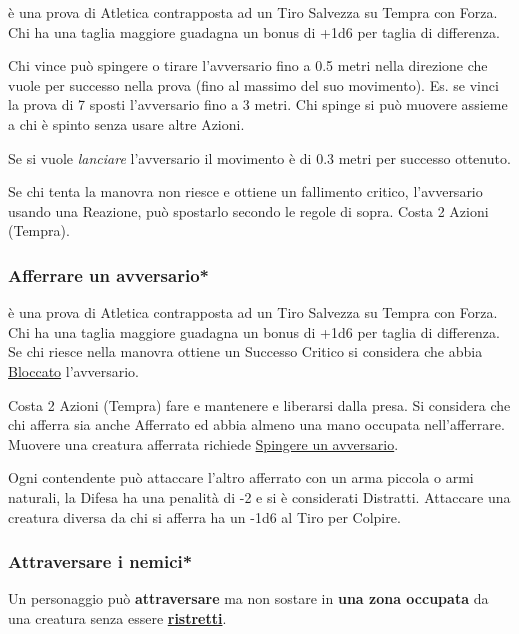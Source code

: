 \begin{multicols}{2}
è una prova di Atletica contrapposta ad un Tiro Salvezza su Tempra con Forza. Chi ha una taglia maggiore guadagna un bonus di +1d6 per taglia di differenza.

Chi vince può spingere o tirare l'avversario fino a 0.5 metri nella direzione che vuole per successo nella prova (fino al massimo del suo movimento). Es. se vinci la prova di 7 sposti l'avversario fino a 3 metri. Chi spinge si può muovere assieme a chi è spinto senza usare altre Azioni.

Se si vuole \emph{lanciare} l'avversario il movimento è di 0.3 metri per successo ottenuto.

Se chi tenta la manovra non riesce e ottiene un fallimento critico, l'avversario usando una Reazione, può spostarlo secondo le regole di sopra. Costa 2 Azioni (Tempra).

\subsubsection{Afferrare un avversario*}\label{afferrareunavversario}\hypertarget{afferrareunavversario}{}

è una prova di Atletica contrapposta ad un Tiro Salvezza su Tempra con Forza. Chi ha una taglia maggiore guadagna un bonus di +1d6 per taglia di differenza. Se chi riesce nella manovra ottiene un Successo Critico si considera che abbia \hyperlink{bloccato}{Bloccato} l'avversario.

Costa 2 Azioni (Tempra) fare e mantenere e liberarsi dalla presa. Si considera che chi afferra sia anche Afferrato ed abbia almeno una mano occupata nell'afferrare.
Muovere una creatura afferrata richiede \hyperlink{spingereavversario}{Spingere un avversario}.

Ogni contendente può attaccare l'altro afferrato con un arma piccola o armi naturali, la Difesa ha una penalità di -2 e si è considerati Distratti. Attaccare una creatura diversa da chi si afferra ha un -1d6 al Tiro per Colpire.

\subsubsection{Attraversare i nemici*}\label{attraversonemici}\hypertarget{attraversarenemici}{}\hypertarget{destreggiarsi}{}

Un personaggio può \textbf{attraversare} ma non sostare in \textbf{una zona occupata} da una creatura senza essere \hyperlink{ristretto}{\textbf{ristretti}}.


\end{multicols}
